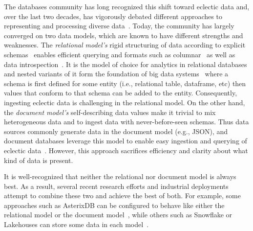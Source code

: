 The databases community has long recognized this shift toward eclectic data and, over the last two decades, has vigorously debated different approaches to representing and processing diverse data~. Today, the community has largely converged on two data models, which are known to have different strengths and weaknesses. The {\em relational model's} rigid structuring of data according to explicit schemas~ enables efficient querying and formats such as columnar~ as well as data introspection~\cite{aurum}.
It is the model of choice for analytics in relational databases and nested variants of it form the foundation of big data systems~\cite{avro, parquet, dremel, spark, delta_lake} where a schema is first defined for some entity (i.e., relational table, dataframe, etc) then values that conform to that schema can be added to the entity. Consequently, ingesting eclectic data is challenging in the relational model. On the other hand, the {\em document model's} self-describing data values make it trivial to mix heterogeneous data and to ingest data with never-before-seen schemas. Thus data sources commonly generate data in the document model (e.g., JSON), and document databases leverage this model to enable easy ingestion and querying of eclectic data~\cite{mongo, couchbase}. However, this approach sacrifices efficiency and clarity about what kind of data is present. 

It is well-recognized that neither the relational nor document model is always best.
As a result, several recent research efforts and industrial deployments attempt to combine these two and achieve the best of both. For example, some approaches such as AsterixDB can be configured to behave like either the relational model or the document model~\cite{asterixdb, sql++}, while others such as Snowflake or Lakehouses can store some data in each model~\cite{snowflake, postgres, bigdawg, dbms+, delta_lake, lakehouse}.

